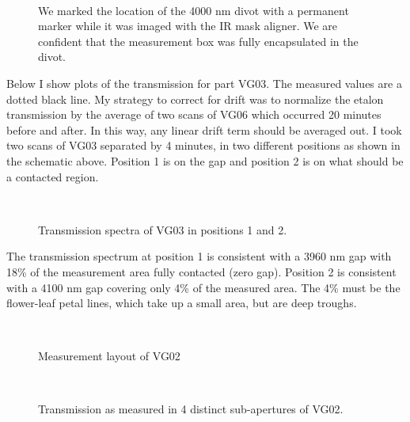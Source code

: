 \begin{figure}[h!] 
\begin{center}
\ 
\caption[VG03 Schematic]{We marked the location of the 4000 nm divot with a permanent marker while it was imaged with the IR mask aligner.  We are confident that the measurement box was fully encapsulated in the divot.}
\label{fig:VG03schematicl}
\end{center}
\end{figure}

Below I show plots of the transmission for part VG03.  The measured values are a dotted black line.  My strategy to correct for drift was to normalize the etalon transmission by the average of two scans of VG06 which occurred 20 minutes before and after.  In this way, any linear drift term should be averaged out.  I took two scans of VG03 separated by 4 minutes, in two different positions as shown in the schematic above.  Position 1 is on the gap and position 2 is on what should be a contacted region.  

\begin{figure}[h!] 
\begin{center}
\ 
\caption[VG03 Transmission]{Transmission spectra of VG03 in positions 1 and 2.}
\label{fig:VG03transl}
\end{center}
\end{figure}

The transmission spectrum at position 1 is consistent with a 3960 nm gap with 18\% of the measurement area fully contacted (zero gap).  Position 2 is consistent with a 4100 nm gap covering only 4\% of the measured area.  The 4\% must be the flower-leaf petal lines, which take up a small area, but are deep troughs. 

\begin{figure}[h!] 
\begin{center}
\ 
\caption[VG02 measurement position layout]{Measurement layout of VG02}
\label{fig:VG02layout}
\end{center}
\end{figure}

\begin{figure}[h!] 
\begin{center}
\ 
\caption[VG02 transmission in 4 position]{Transmission as measured in 4 distinct sub-apertures of VG02.}
\label{fig:VG02trans}
\end{center}
\end{figure}


